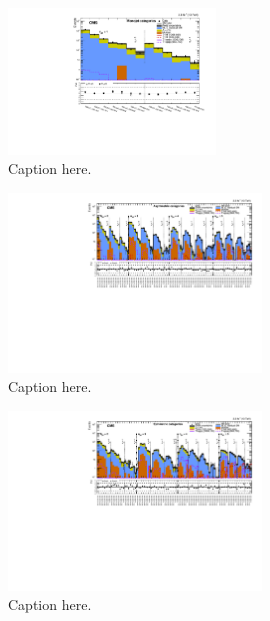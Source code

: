 \begin{figure}[!h]
  \begin{center}
    \includegraphics[width=0.49\textwidth]{figures/result/summaryPlot_Monojet_prefit_overlay_fit_b}
    \caption{Caption here.}
    \label{fig:result}
  \end{center}
\end{figure}

\begin{figure}[!h]
  \begin{center}
    \includegraphics[angle=90,width=0.60\textwidth]{figures/result/summaryPlot_Asymmetric_prefit_overlay_fit_b}
    \caption{Caption here.}
    \label{fig:result}
  \end{center}
\end{figure}

\begin{figure}[!h]
  \begin{center}
    \includegraphics[angle=90,width=0.60\textwidth]{figures/result/summaryPlot_Symmetric_prefit_overlay_fit_b}
    \caption{Caption here.}
    \label{fig:result}
  \end{center}
\end{figure}

